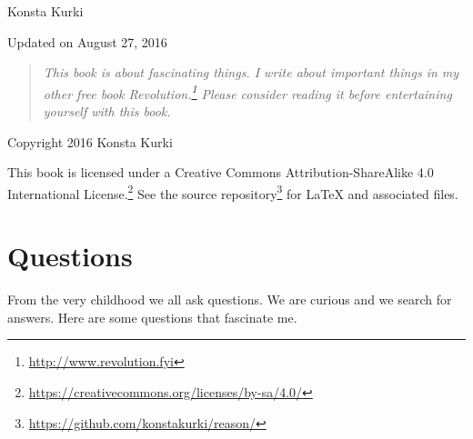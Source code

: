\documentclass[11pt,%
]{memoir}
\begin{document}
\frontmatter

\thispagestyle{empty}


\vspace{0.3in}

\noindent Konsta Kurki

\vspace{0.3in}

\noindent Updated on August 27, 2016

\vfill

\begin{quote}
\noindent\emph{This book is about fascinating things. I write about important things in my other free book \emph{Revolution}.\footnote{\url{http://www.revolution.fyi}} Please consider reading it before entertaining yourself with this book.}
\end{quote}

\vfill

\noindent Copyright {\textcopyright} 2016 Konsta Kurki

\vspace{0.18in}

\noindent This book is licensed under a Creative Commons Attribution-ShareAlike 4.0 International License.\footnote{\url{https://creativecommons.org/licenses/by-sa/4.0/}} See the source repository\footnote{\url{https://github.com/konstakurki/reason/}} for {\LaTeX} and associated files.

\newpage

\mainmatter

\tableofcontents

\chapter{Questions}

From the very childhood we all ask questions. We are curious and we search for answers. Here are some questions that fascinate me.
\end{document}
